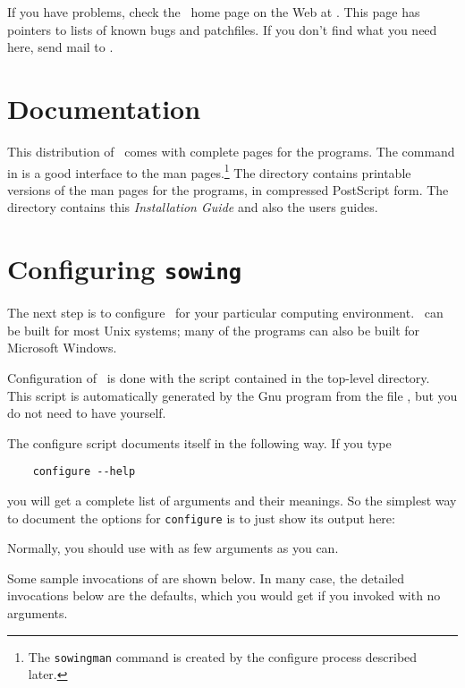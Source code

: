 {If you have problems, check the \sowing\ home page on the Web at
\gb{} .  This page has pointers
to lists of known bugs and patchfiles.  If you don't find what you need here,
send mail to .

\section{Documentation}
\label{sec:documentation}

This distribution of \sowing\ comes with complete  pages for the
programs.  The command  in  is a good
interface to the man pages.\footnote{The {\tt sowingman} command is created by
  the configure process described later.}
The  directory contains printable versions
of the man pages for the programs, in compressed PostScript form.
The  directory contains this {\em Installation Guide\/} and
also the users guides.

\section{Configuring {\tt sowing}}
\label{sec:configuring}

The next step is to configure \sowing\ for your particular computing
environment.  \sowing\ can be built for most Unix systems; many of the
programs can also be built for Microsoft Windows.

Configuration of \sowing\ is done with the  script contained in
the top-level directory.  This script is automatically generated by the Gnu
 program from the file , but you do not need
to have  yourself.

The configure script documents itself in the following way.  If you type
\begin{verbatim}
    configure --help
\end{verbatim}
you will get a complete list of arguments and their meanings.  So the
simplest way to document the options for {\tt configure} is to just show
its output here:
\bigskip


Normally, you should use  with as few arguments as you can.

Some sample invocations of  are shown below.  In many case,
the detailed invocations below are the defaults, which you would get if you
invoked  with no arguments.

}
